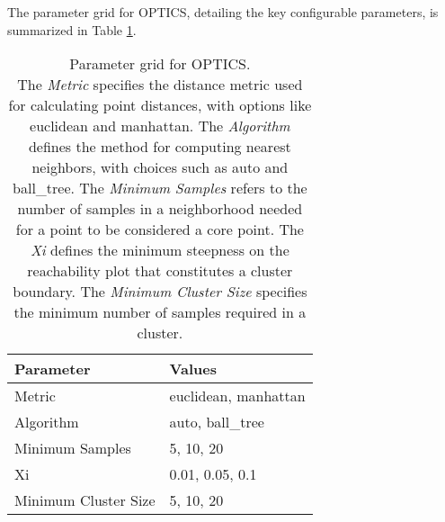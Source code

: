 The parameter grid for OPTICS, detailing the key configurable parameters, 
is summarized in Table \ref{tab:optics-param-grid}.

\begin{table}[htb]
\centering
\begin{tabularx}{\columnwidth}{|X|X|}
    \hline
    \textbf{Parameter} & \textbf{Values} \\ \hline
    Metric & euclidean, manhattan \\ \hline
    Algorithm & auto, ball\_tree \\ \hline
    Minimum Samples & 5, 10, 20 \\ \hline
    Xi & 0.01, 0.05, 0.1 \\ \hline
    Minimum Cluster Size & 5, 10, 20 \\ \hline
\end{tabularx}
\caption{
    Parameter grid for OPTICS.\\ 
    The \textit{Metric} specifies the distance metric used for calculating point distances, with options like euclidean and manhattan.
    The \textit{Algorithm} defines the method for computing nearest neighbors, with choices such as auto and ball\_tree.
    The \textit{Minimum Samples} refers to the number of samples in a neighborhood needed for a point to be considered a core point.
    The \textit{Xi} defines the minimum steepness on the reachability plot that constitutes a cluster boundary.
    The \textit{Minimum Cluster Size} specifies the minimum number of samples required in a cluster.
}
\label{tab:optics-param-grid}
\end{table}





